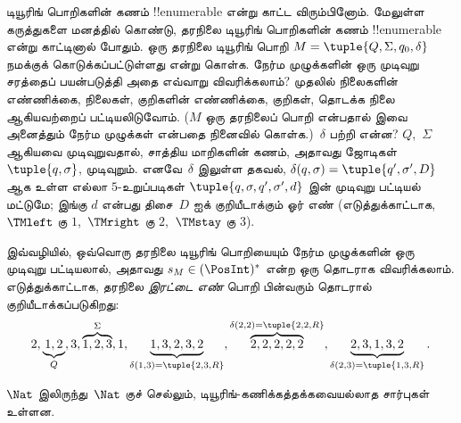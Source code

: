 \documentclass[../../../include/open-logic-section]{subfiles}
\begin{document}
\begin{explain}
டியூரிங் பொறிகளின் கணம் !!{enumerable} என்று காட்ட விரும்பினோம்.
மேலுள்ள கருத்துகளை மனத்தில் கொண்டு, தரநிலை டியூரிங் பொறிகளின் கணம்
!!{enumerable} என்று காட்டினால் போதும். ஒரு தரநிலை டியூரிங் பொறி
$M = \tuple{Q, \Sigma, q_0, \delta}$ நமக்குக் கொடுக்கப்பட்டுள்ளது
என்று கொள்க. நேர்ம முழுக்களின் ஒரு முடிவுறு சரத்தைப் பயன்படுத்தி அதை
எவ்வாறு விவரிக்கலாம்? முதலில் நிலைகளின் எண்ணிக்கை, நிலைகள், குறிகளின்
எண்ணிக்கை, குறிகள், தொடக்க நிலை ஆகியவற்றைப் பட்டியலிடுவோம். ($M$ ஒரு
தரநிலைப் பொறி என்பதால் இவை அனைத்தும் நேர்ம முழுக்கள் என்பதை நினைவில்
கொள்க.)~$\delta$ பற்றி என்ன? $Q$,~$\Sigma$ ஆகியவை முடிவுறுவதால்,
சாத்திய மாறிகளின் கணம், அதாவது ஜோடிகள் $\tuple{q,\sigma}$, முடிவுறும்.
எனவே~$\delta$ இலுள்ள தகவல், $\delta(q,\sigma) =
\tuple{q', \sigma', D}$ ஆக உள்ள எல்லா $5$-உறுப்படிகள்
$\tuple{q, \sigma, q', \sigma', d}$ இன் முடிவுறு பட்டியல் மட்டுமே;
இங்கு $d$ என்பது திசை~$D$ ஐக் குறியீடாக்கும் ஓர் எண் (எடுத்துக்காட்டாக,
~$\TMleft$ கு $1$,~$\TMright$ கு $2$,~$\TMstay$ கு $3$).

இவ்வழியில், ஒவ்வொரு தரநிலை டியூரிங் பொறியையும் நேர்ம முழுக்களின் ஒரு
முடிவுறு பட்டியலால், அதாவது $s_M \in (\PosInt)^*$ என்ற ஒரு தொடராக
விவரிக்கலாம். எடுத்துக்காட்டாக, தரநிலை \emph{இரட்டை எண்} பொறி
பின்வரும் தொடரால் குறியீடாக்கப்படுகிறது:
\[
2, \underbrace{1, 2}_Q, 3, \overbrace{1, 2, 3}^\Sigma, 1, \underbrace{1, 3, 2, 3, 2}_{\delta(1,3) = \tuple{2,3,R}}, 
\overbrace{2, 2, 2, 2, 2}^{\delta(2,2) = \tuple{2,2,R}},
\underbrace{2, 3, 1, 3, 2}_{\delta(2,3) = \tuple{1,3,R}}.
\]
\end{explain}

\begin{thm}
$\Nat$ இலிருந்து~$\Nat$ குச் செல்லும், டியூரிங்-கணிக்கத்தக்கவையல்லாத
சார்புகள் உள்ளன.
\end{thm}
\end{document}
